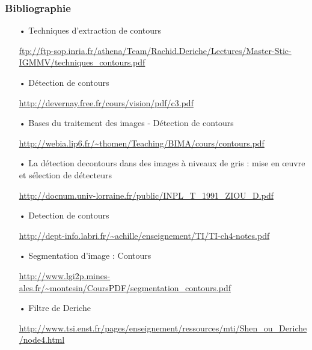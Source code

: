 \documentclass{beamer}
\begin{document}
\begin{frame}
\frametitle{Bibliographie}
	
\begin{itemize}
\item[•] Techniques d’extraction de contours
\item[] \url{ftp://ftp-sop.inria.fr/athena/Team/Rachid.Deriche/Lectures/Master-Stic-IGMMV/techniques_contours.pdf}

\item[•] Détection de contours
\item[] \url{http://devernay.free.fr/cours/vision/pdf/c3.pdf}

\item[•] Bases du traitement des images - Détection de contours
\item[] \url{http://webia.lip6.fr/~thomen/Teaching/BIMA/cours/contours.pdf}

\item[•] La détection decontours dans des images à niveaux de gris : mise en œuvre et sélection de détecteurs 
\item[] \url{http://docnum.univ-lorraine.fr/public/INPL_T_1991_ZIOU_D.pdf}

\item[•] Detection de contours
\item[] \url{http://dept-info.labri.fr/~achille/enseignement/TI/TI-ch4-notes.pdf}

\item[•] Segmentation d'image : Contours
\item[] \url{http://www.lgi2p.mines-ales.fr/~montesin/CoursPDF/segmentation_contours.pdf}

\item[•] Filtre de Deriche
\item[] \url{http://www.tsi.enst.fr/pages/enseignement/ressources/mti/Shen_ou_Deriche/node4.html}


\end{itemize}
\end{frame}
\end{document}

